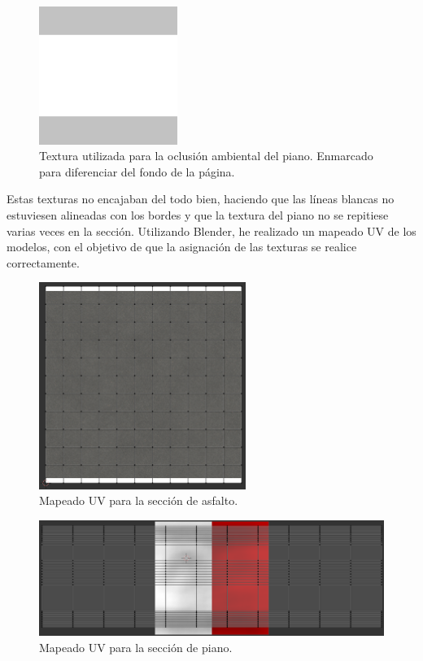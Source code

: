 \begin{figure}[H]
    \centering
    \includegraphics[width=0.4\textwidth,cframe=black 0.5pt 0pt]{imagenes/pista/kerb-dirty2-AO.png}
    \caption{Textura utilizada para la oclusión ambiental del piano. Enmarcado para diferenciar del fondo de la página.}
    \label{fig:pianoao}
\end{figure}

Estas texturas no encajaban del todo bien, haciendo que las líneas blancas no estuviesen alineadas con los bordes y que la textura del piano no se repitiese varias veces en la sección. Utilizando Blender, he realizado un mapeado UV de los modelos, con el objetivo de que la asignación de las texturas se realice correctamente.

\begin{figure}[H]
    \centering
    \includegraphics[width=0.6\textwidth]{imagenes/pista/uv-straight.png}
    \caption{Mapeado UV para la sección de asfalto.}
    \label{fig:uvasphalt}
\end{figure}

\begin{figure}[H]
    \centering
    \includegraphics[width=\textwidth]{imagenes/pista/uv-kerb.png}
    \caption{Mapeado UV para la sección de piano.}
    \label{fig:uvkerb}
\end{figure}

